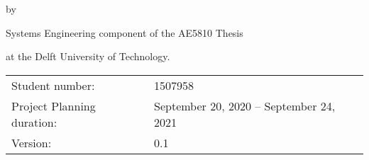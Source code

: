 \begin{titlepage}


\begin{center}


{\makeatletter
\largetitlestyle\fontsize{26}{26}\selectfont\@title
\makeatother}

{\makeatletter
\ifx\@subtitle\undefined\else
    \bigskip
   {\tudsffamily\fontsize{18}{20}\selectfont\@subtitle}    
\fi
\makeatother}

\bigskip
\bigskip

by

\bigskip
\bigskip

{\makeatletter
\largetitlestyle\fontsize{16}{26}\selectfont\@author
\makeatother}

\bigskip
\bigskip

Systems Engineering component of the AE5810 Thesis

at the Delft University of Technology.


\vfill

\begin{tabular}{lll}
    Student number: & 1507958\\
    Project Planning duration: & \multicolumn{2}{l}{September 20, 2020 -- September 24, 2021} \\
    Version: & 0.1 \\
\end{tabular}


\end{center}
\end{titlepage}
